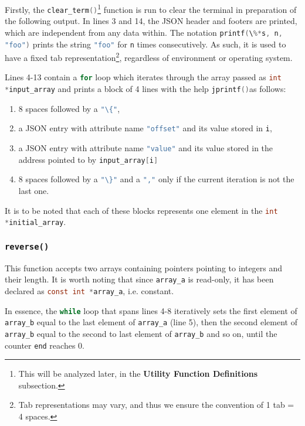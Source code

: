 \documentclass{article}
\newcommand{\code}[1]{\lstinline[language=C]!#1!}
\begin{document}
Firstly, the \code{clear_term()}\footnote{This will be analyzed later, in the \textbf{Utility
Function Definitions} subsection.} function is run to clear the terminal in preparation of the
following output. In lines 3 and 14, the JSON header and footers are printed, which are
independent from any data within. The notation \code{printf(\%*s, n, "foo")} prints the string
\code{"foo"} for \code{n} times consecutively. As such, it is used to have a fixed tab
representation\footnote{Tab representations may vary, and thus we ensure the convention of
1 tab = 4 spaces.}, regardless of environment or operating system.

Lines 4-13 contain a \code{for} loop which iterates through the array passed as \code{int 
*input_array} and prints a block of 4 lines with the help \code{jprintf()}\footnotemark[1] as
follows: 

\begin{enumerate}
	\item 8 spaces followed by a \code{"\{"},
	\item a JSON entry with attribute name \code{"offset"} and its value stored in \code{i},
	\item a JSON entry with attribute name \code{"value"} and its value stored in the address
		pointed to by \code{input_array[i]}
	\item 8 spaces followed by a \code{"\}"} and a \code{","} only if the current iteration is not the last one.
\end{enumerate}

It is to be noted that each of these blocks represents one element in the \code{int *initial_array}.

\newpage

\subsubsection{\texttt{reverse()}}



This function accepts two arrays containing pointers pointing to integers and their length. It is
worth noting that since \code{array_a} is read-only, it has been declared as \code{const int
*array_a}, i.e. constant.

In essence, the \code{while} loop that spans lines 4-8 iteratively sets the first element of
\code{array_b} equal to the last element of \code{array_a} (line 5), then the second element of
\code{array_b} equal to the second to last element of \code{array_b} and so on, until the counter
\code{end} reaches 0. 
\end{document}
